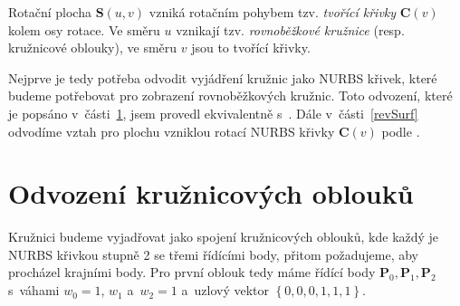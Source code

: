 Rotační plocha $\mathbf{S}\left(u,v\right)$ vzniká rotačním pohybem tzv. \emph{tvořící křivky} $\mathbf{C}\left(v\right)$ kolem osy rotace. Ve směru $u$ vznikají tzv. \emph{rovnoběžkové kružnice} (resp. kružnicové oblouky), ve směru $v$ jsou to tvořící křivky. \cite{Linkeova2015} 

Nejprve je tedy potřeba odvodit vyjádření kružnic 
jako NURBS křivek, které budeme potřebovat pro zobrazení rovnoběžkových kružnic. Toto odvození, které je popsáno v~části~\ref{odvozeni}, jsem provedl ekvivalentně s~\cite{Shenec19972014}. %
Dále v~části~\ref{revSurf} odvodíme vztah pro plochu vzniklou rotací NURBS křivky $\mathbf{C}\left(v\right)$ podle \cite{Pieglc1997}.

\section{Odvození kružnicových oblouků}\label{odvozeni}
Kružnici budeme vyjadřovat jako spojení kružnicových oblouků, kde každý je NURBS křivkou stupně 2 se třemi řídícími body, přitom požadujeme, aby procházel krajními body. Pro první oblouk tedy máme řídící body $\mathbf{P}_0, \mathbf{P}_1, \mathbf{P}_2$ s~váhami $w_0=1$, $w_1$ a~$w_2=1$ a~uzlový vektor $\left\lbrace 0,0,0,1,1,1\right\rbrace$.

